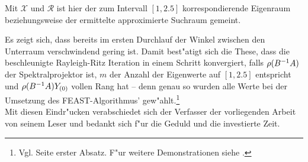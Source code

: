 Mit $\mathcal{X}$ und $\mathcal{R}$ ist hier der zum Intervall $[1,2.5]$ korrespondierende Eigenraum beziehungsweise der ermittelte approximierte Suchraum gemeint.

\newpage
Es zeigt sich, dass bereits im ersten Durchlauf der Winkel zwischen den Unterraum verschwindend gering ist. Damit best"atigt sich die These, dass die beschleunigte Rayleigh-Ritz Iteration in einem Schritt konvergiert, falls $\rho(B^{-1}A)$ der Spektralprojektor ist, $m$ der Anzahl der Eigenwerte auf $[1,2.5]$ entspricht und $\rho(B^{-1}A)Y_{(0)}$ vollen Rang hat -- denn genau so wurden alle Werte bei der Umsetzung des FEAST-Algorithmus' gew"ahlt.\footnote{Vgl. Seite \pageref{eq:quadratur} erster Absatz. F"ur weitere Demonstrationen siehe \cite{feast}.}\\

Mit diesen Eindr"ucken verabschiedet sich der Verfasser der vorliegenden Arbeit von seinem Leser und bedankt sich f"ur die Geduld und die investierte Zeit.
